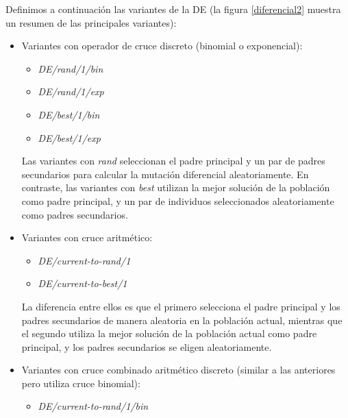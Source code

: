 \newpage
Definimos a continuación las variantes de la DE (la figura \ref{diferencial2} muestra un resumen de
las principales variantes):
\begin{itemize}
	\item Variantes con operador de cruce discreto (binomial o exponencial):
		\begin{itemize}
			\item \textit{DE/rand/1/bin}
			\item \textit{DE/rand/1/exp}
			\item \textit{DE/best/1/bin}
			\item \textit{DE/best/1/exp}
	   \end{itemize}
		Las variantes con \textit{rand} seleccionan el padre principal y un
		par de padres secundarios para calcular la mutación diferencial aleatoriamente. En
		contraste, las	variantes con \textit{best} utilizan la mejor solución
		de la población	como padre principal, y un par de individuos seleccionados
		aleatoriamente como padres		secundarios.
	\item Variantes con cruce aritmético:
		\begin{itemize}
			\item \textit{DE/current-to-rand/1}
			\item \textit{DE/current-to-best/1}
	   \end{itemize}
		La diferencia entre ellos es que el primero selecciona el padre principal y los
		padres secundarios de manera aleatoria en la población actual, mientras que el
		segundo utiliza la mejor solución de la población actual como padre principal, y los
		padres secundarios se eligen aleatoriamente.
			\item Variantes con cruce combinado aritmético discreto (similar a las anteriores pero
		utiliza cruce binomial):
		\begin{itemize}
			\item \textit{DE/current-to-rand/1/bin}
	   \end{itemize}
\end{itemize}
\newpage
